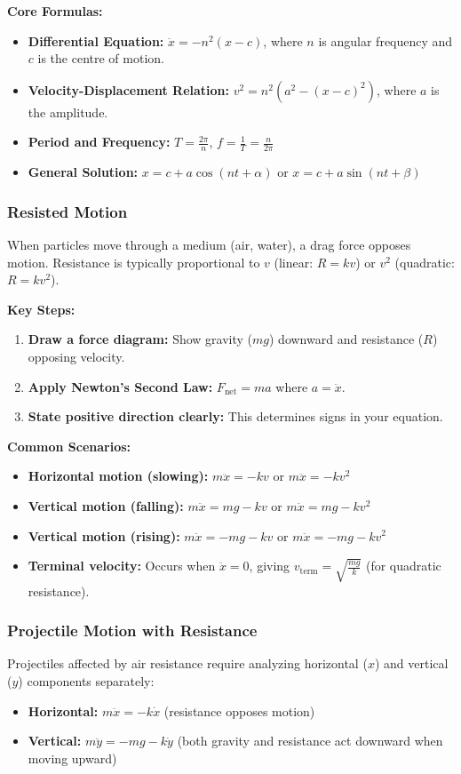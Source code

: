 \documentclass[12pt]{article}
\begin{document}
\textbf{Core Formulas:}
\begin{itemize}[leftmargin=*]
  \item \textbf{Differential Equation:} $\ddot{x} = -n^2(x - c)$, where $n$ is angular frequency and $c$ is the centre of motion.
  \item \textbf{Velocity-Displacement Relation:} $v^2 = n^2(a^2 - (x-c)^2)$, where $a$ is the amplitude.
  \item \textbf{Period and Frequency:} $T = \frac{2\pi}{n}$, $f = \frac{1}{T} = \frac{n}{2\pi}$
  \item \textbf{General Solution:} $x = c + a\cos(nt + \alpha)$ or $x = c + a\sin(nt + \beta)$
\end{itemize}

\subsubsection*{Resisted Motion}
When particles move through a medium (air, water), a drag force opposes motion. Resistance is typically proportional to $v$ (linear: $R = kv$) or $v^2$ (quadratic: $R = kv^2$).

\textbf{Key Steps:}
\begin{enumerate}[leftmargin=*]
  \item \textbf{Draw a force diagram:} Show gravity ($mg$) downward and resistance ($R$) opposing velocity.
  \item \textbf{Apply Newton's Second Law:} $F_{\text{net}} = ma$ where $a = \ddot{x}$.
  \item \textbf{State positive direction clearly:} This determines signs in your equation.
\end{enumerate}

\textbf{Common Scenarios:}
\begin{itemize}[leftmargin=*]
  \item \textbf{Horizontal motion (slowing):} $m\ddot{x} = -kv$ or $m\ddot{x} = -kv^2$
  \item \textbf{Vertical motion (falling):} $m\ddot{x} = mg - kv$ or $m\ddot{x} = mg - kv^2$
  \item \textbf{Vertical motion (rising):} $m\ddot{x} = -mg - kv$ or $m\ddot{x} = -mg - kv^2$
  \item \textbf{Terminal velocity:} Occurs when $\ddot{x} = 0$, giving $v_{\text{term}} = \sqrt{\frac{mg}{k}}$ (for quadratic resistance).
\end{itemize}

\subsubsection*{Projectile Motion with Resistance}
Projectiles affected by air resistance require analyzing horizontal ($x$) and vertical ($y$) components separately:
\begin{itemize}[leftmargin=*]
  \item \textbf{Horizontal:} $m\ddot{x} = -k\dot{x}$ (resistance opposes motion)
  \item \textbf{Vertical:} $m\ddot{y} = -mg - k\dot{y}$ (both gravity and resistance act downward when moving upward)
\end{itemize}
\end{document}
